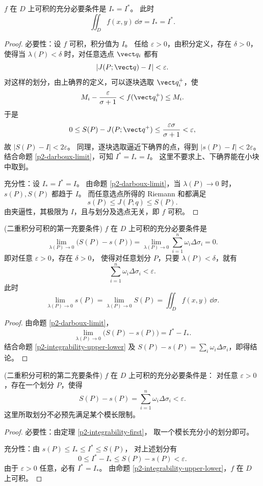 \begin{proposition}[上下积分相等判据]\label{p2-integrability-upper-lower}
$f$ 在 $D$ 上可积的充分必要条件是 $I_*=I^*$。
此时
\[
\iint_D f(x,y)\,\dd\sigma=I_*=I^*.
\]
\end{proposition}
\begin{proof}
必要性：设 $f$ 可积，积分值为 $I$。
任给 $\varepsilon>0$，由积分定义，存在 $\delta>0$，
使得当 $\lambda(P)<\delta$ 时，对任意选点 $\vect q_i$ 都有
\[
|J(P;\vect q)-I|<\varepsilon.
\]
对这样的划分，由上确界的定义，可以逐块选取 $\vect q_i^+$，使
\[
M_i-\frac{\varepsilon}{\sigma+1}<f(\vect q_i^+)\le M_i.
\]
于是
\[
0\le S(P)-J(P;\vect q^+)\le
\frac{\varepsilon\sigma}{\sigma+1}<\varepsilon,
\]
故 $|S(P)-I|<2\varepsilon$。
同理，逐块选取逼近下确界的点，得到 $|s(P)-I|<2\varepsilon$。
结合命题 \ref{p2-darboux-limit}，可知 $I^*=I_*=I$。
这里不要求上、下确界能在小块中取到。

充分性：设 $I_*=I^*=I$。
由命题 \ref{p2-darboux-limit}，当 $\lambda(P)\to0$ 时，
$s(P),S(P)$ 都趋于 $I$。
而任意选点所得的 Riemann 和都满足
\[
s(P)\le J(P;q)\le S(P).
\]
由夹逼性，其极限为 $I$，且与划分及选点无关，即 $f$ 可积。
\end{proof}

\begin{theorem}(二重积分可积的第一充要条件)\label{p2-integrability-first}
$f$ 在 $D$ 上可积的充分必要条件是
\[
\lim_{\lambda(P)\to0}\bigl(S(P)-s(P)\bigr)
=\lim_{\lambda(P)\to0}\sum_{i=1}^n\omega_i\Delta\sigma_i=0.
\]
即对任意 $\varepsilon>0$，存在 $\delta>0$，
使得对任意划分 $P$，只要 $\lambda(P)<\delta$，就有
\[
\sum_{i=1}^n\omega_i\Delta\sigma_i<\varepsilon.
\]
此时
\[
\lim_{\lambda(P)\to0}s(P)
=\lim_{\lambda(P)\to0}S(P)
=\iint_D f(x,y)\,\dd\sigma.
\]
\end{theorem}
\begin{proof}
由命题 \ref{p2-darboux-limit}，
\[
\lim_{\lambda(P)\to0}\bigl(S(P)-s(P)\bigr)=I^*-I_*.
\]
结合命题 \ref{p2-integrability-upper-lower} 及
$S(P)-s(P)=\sum_i\omega_i\Delta\sigma_i$，即得结论。
\end{proof}

\begin{theorem}(二重积分可积的第二充要条件)\label{p2-integrability-second}
$f$ 在 $D$ 上可积的充分必要条件是：
对任意 $\varepsilon>0$，存在一个划分 $P$，使得
\[
S(P)-s(P)=\sum_{i=1}^n\omega_i\Delta\sigma_i<\varepsilon.
\]
这里所取划分不必预先满足某个模长限制。
\end{theorem}
\begin{proof}
必要性：由定理 \ref{p2-integrability-first}，
取一个模长充分小的划分即可。

充分性：由 $s(P)\le I_*\le I^*\le S(P)$，
对上述划分有
\[
0\le I^*-I_*\le S(P)-s(P)<\varepsilon.
\]
由于 $\varepsilon>0$ 任意，必有 $I^*=I_*$。
由命题 \ref{p2-integrability-upper-lower}，$f$ 在 $D$ 上可积。
\end{proof}

